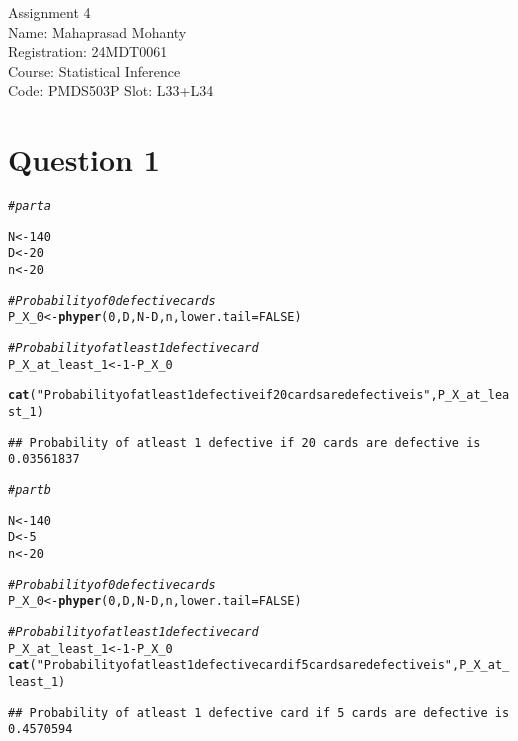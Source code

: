 \documentclass{article}\usepackage[]{graphicx}\usepackage[]{xcolor}
\makeatletter
\newcommand{\hlnum}[1]{\textcolor[rgb]{0.686,0.059,0.569}{#1}}%
\newcommand{\hlsng}[1]{\textcolor[rgb]{0.192,0.494,0.8}{#1}}%
\newcommand{\hlcom}[1]{\textcolor[rgb]{0.678,0.584,0.686}{\textit{#1}}}%
\newcommand{\hlopt}[1]{\textcolor[rgb]{0,0,0}{#1}}%
\newcommand{\hldef}[1]{\textcolor[rgb]{0.345,0.345,0.345}{#1}}%
\newcommand{\hlkwb}[1]{\textcolor[rgb]{0.69,0.353,0.396}{#1}}%
\newcommand{\hlkwc}[1]{\textcolor[rgb]{0.333,0.667,0.333}{#1}}%
\newcommand{\hlkwd}[1]{\textcolor[rgb]{0.737,0.353,0.396}{\textbf{#1}}}%
\newenvironment{kframe}{%
 \def\at@end@of@kframe{}%
 \ifinner\ifhmode%
  \def\at@end@of@kframe{\end{minipage}}%
  \begin{minipage}{\columnwidth}%
 \fi\fi%
 \def\FrameCommand##1{\hskip\@totalleftmargin \hskip-\fboxsep
 \colorbox{shadecolor}{##1}\hskip-\fboxsep
     \hskip-\linewidth \hskip-\@totalleftmargin \hskip\columnwidth}%
 \MakeFramed {\advance\hsize-\width
   \@totalleftmargin\z@ \linewidth\hsize
   \@setminipage}}%
 {\par\unskip\endMakeFramed%
 \at@end@of@kframe}
\newenvironment{knitrout}{}{} %
\makeatother
\begin{document}
\begin{center}
Assignment 4 \\
Name: Mahaprasad Mohanty \\
Registration: 24MDT0061 \\
Course: Statistical Inference \\
Code: PMDS503P
Slot: L33+L34
\end{center}

\section{Question 1}
\begin{knitrout}
\color{fgcolor}\begin{kframe}
\begin{alltt}
\hlcom{# part a}

\hldef{N} \hlkwb{<-} \hlnum{140}
\hldef{D} \hlkwb{<-} \hlnum{20}
\hldef{n} \hlkwb{<-} \hlnum{20}

\hlcom{# Probability of 0 defective cards}
\hldef{P_X_0} \hlkwb{<-} \hlkwd{phyper}\hldef{(}\hlnum{0}\hldef{, D, N}\hlopt{-}\hldef{D, n,} \hlkwc{lower.tail} \hldef{=} \hlnum{FALSE}\hldef{)}


\hlcom{# Probability of at least 1 defective card}
\hldef{P_X_at_least_1} \hlkwb{<-} \hlnum{1} \hlopt{-} \hldef{P_X_0}

\hlkwd{cat}\hldef{(}\hlsng{"Probability of atleast 1 defective if 20 cards are defective is"}\hldef{, P_X_at_least_1)}
\end{alltt}
\begin{verbatim}
## Probability of atleast 1 defective if 20 cards are defective is 0.03561837
\end{verbatim}
\begin{alltt}
\hlcom{# part b}

\hldef{N} \hlkwb{<-} \hlnum{140}
\hldef{D} \hlkwb{<-} \hlnum{5}
\hldef{n} \hlkwb{<-} \hlnum{20}

\hlcom{# Probability of 0 defective cards}
\hldef{P_X_0} \hlkwb{<-} \hlkwd{phyper}\hldef{(}\hlnum{0}\hldef{, D, N}\hlopt{-}\hldef{D, n,} \hlkwc{lower.tail} \hldef{=} \hlnum{FALSE}\hldef{)}

\hlcom{# Probability of at least 1 defective card}
\hldef{P_X_at_least_1} \hlkwb{<-} \hlnum{1} \hlopt{-} \hldef{P_X_0}
\hlkwd{cat}\hldef{(}\hlsng{"Probability of atleast 1 defective card if 5 cards are defective is"}\hldef{, P_X_at_least_1)}
\end{alltt}
\begin{verbatim}
## Probability of atleast 1 defective card if 5 cards are defective is 0.4570594
\end{verbatim}
\end{kframe}
\end{knitrout}
\end{document}
